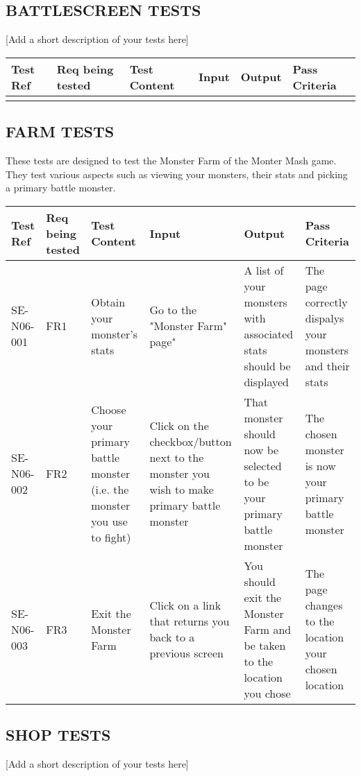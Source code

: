 \documentclass{project}
\begin{document}
\subsection*{BATTLESCREEN TESTS}
[Add a short description of your tests here]

\begin{tabular}{| p{2cm} | p{1cm} | p{2cm} | p{3cm} | p{3cm} | p{3cm} |}
\hline
Test Ref & Req being tested & Test Content & Input & Output & Pass Criteria \\
\hline
 &  &  &  &  &  \\
\hline
\end{tabular}

\subsection*{FARM TESTS}
These tests are designed to test the Monster Farm of the Monter Mash game. They test various aspects such as viewing your monsters, their stats and picking a primary battle monster.

\begin{tabular}{| p{2cm} | p{1cm} | p{2cm} | p{3cm} | p{3cm} | p{3cm} |}
\hline
Test Ref & Req being tested & Test Content & Input & Output & Pass Criteria \\
\hline
SE-N06-001 & FR1 & Obtain your monster's stats & Go to the "Monster Farm" page" & A list of your monsters with associated stats should be displayed & The page correctly dispalys your monsters and their stats \\
\hline
SE-N06-002 & FR2 & Choose your primary battle monster (i.e. the monster you use to fight) & Click on the checkbox/button next to the monster you wish to make primary battle monster & That monster should now be selected to be your primary battle monster& The chosen monster is now your primary battle monster \\
\hline
SE-N06-003 & FR3 & Exit the Monster Farm & Click on a link that returns you back to a previous screen & You should exit the Monster Farm and be taken to the location you chose & The page changes to the location your chosen location \\
\hline
\end{tabular}

\subsection*{SHOP TESTS}
[Add a short description of your tests here]
\end{document}
